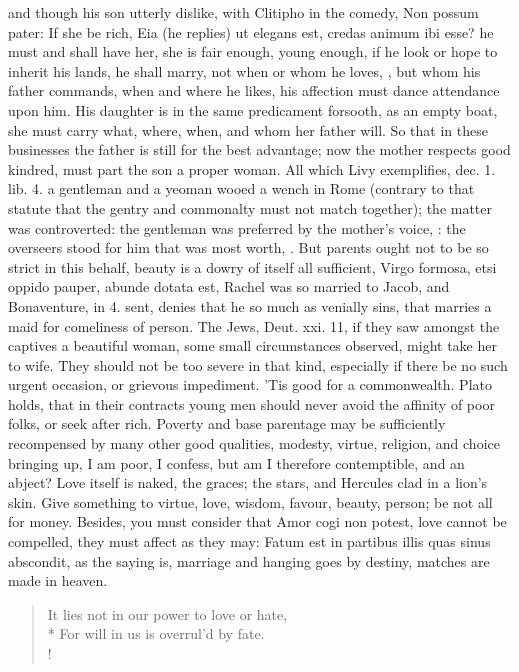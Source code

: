 and though his son utterly dislike, with Clitipho in the comedy, Non
possum pater: If she be rich, Eia (he replies) ut elegans est, credas
animum ibi esse? he must and shall have her, she is fair enough, young
enough, if he look or hope to inherit his lands, he shall marry, not
when or whom he loves, , but whom his father
commands, when and where he likes, his affection must dance attendance
upon him. His daughter is in the same predicament forsooth, as an empty
boat, she must carry what, where, when, and whom her father will. So
that in these businesses the father is still for the best advantage;
now the mother respects good kindred, must part the son a proper woman.
All which  Livy exemplifies, dec. 1. lib. 4. a gentleman and a
yeoman wooed a wench in Rome (contrary to that statute that the gentry
and commonalty must not match together); the matter was controverted:
the gentleman was preferred by the mother's voice, : the overseers stood for
him that was most worth, \etc{}. But parents ought not to be so strict in
this behalf, beauty is a dowry of itself all sufficient, Virgo
formosa, etsi oppido pauper, abunde dotata est, Rachel was so
married to Jacob, and Bonaventure, in 4. sent, denies that he so
much as venially sins, that marries a maid for comeliness of person.
The Jews, Deut. xxi. 11, if they saw amongst the captives a beautiful
woman, some small circumstances observed, might take her to wife. They
should not be too severe in that kind, especially if there be no such
urgent occasion, or grievous impediment. 'Tis good for a commonwealth.
Plato holds, that in their contracts young men should never avoid
the affinity of poor folks, or seek after rich. Poverty and base
parentage may be sufficiently recompensed by many other good qualities,
modesty, virtue, religion, and choice bringing up, I am poor, I
confess, but am I therefore contemptible, and an abject? Love itself is
naked, the graces; the stars, and Hercules clad in a lion's skin. Give
something to virtue, love, wisdom, favour, beauty, person; be not all
for money. Besides, you must consider that Amor cogi non potest, love
cannot be compelled, they must affect as they may: Fatum est in
partibus illis quas sinus abscondit, as the saying is, marriage and
hanging goes by destiny, matches are made in heaven.
%
\begin{verse}%
It lies not in our power to love or hate,\\*
For will in us is overrul'd by fate.\\!
\end{verse}%
